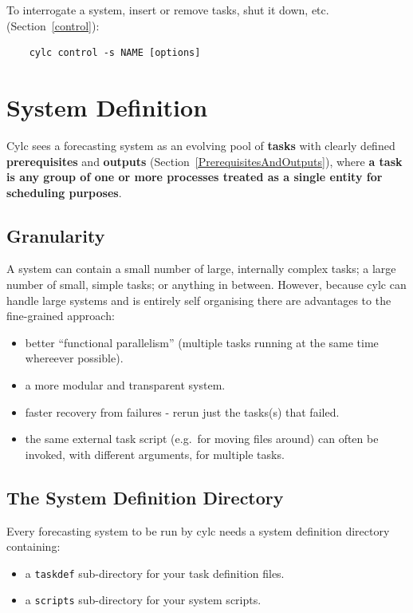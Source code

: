 \documentclass[11pt,a4paper]{article}
\begin{document}
To interrogate a system, insert or remove tasks, shut it down, etc.
(Section~\ref{control}):

\begin{lstlisting}
    cylc control -s NAME [options]
\end{lstlisting}


\section{System Definition} 
\label{SystemDefinition}

Cylc sees a forecasting system as an evolving pool of {\bf tasks}
with clearly defined {\bf prerequisites} and {\bf outputs}
(Section~\ref{PrerequisitesAndOutputs}), where {\bf a task
is any group of one or more processes treated as a single entity for
scheduling purposes}.


\subsection{Granularity} 
\label{Granularity}

A system can contain a small number of large, internally complex tasks;
a large number of small, simple tasks; or anything in between. However,
because cylc can handle large systems and is entirely self organising
there are advantages to the fine-grained approach: 

\begin{itemize}
    \item better ``functional parallelism'' (multiple tasks running
        at the same time whereever possible).
    \item a more modular and transparent system.
    \item faster recovery from failures - rerun just the tasks(s) that
        failed. 
    \item the same external task script (e.g.\ for moving files around)
        can often be invoked, with different arguments, for multiple
        tasks.
\end{itemize}


\subsection{The System Definition Directory} 
\label{TheSystemDefinitionDirectory}

Every forecasting system to be run by cylc needs a system definition
directory containing: 

\begin{itemize} 
    \item a \lstinline=taskdef= sub-directory for your task definition
        files.
    \item a \lstinline=scripts= sub-directory for your system scripts.
\end{itemize} 
\end{document}
